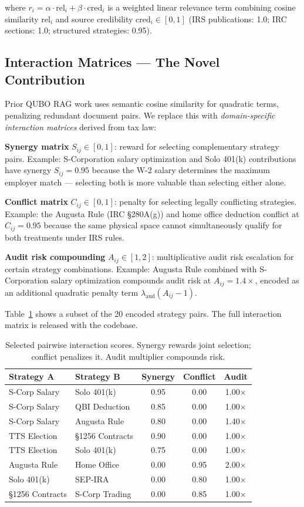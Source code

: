 \documentclass{article}
\begin{document}
where $r_i = \alpha \cdot \text{rel}_i + \beta \cdot \text{cred}_i$ is
a weighted linear relevance term combining cosine similarity
$\text{rel}_i$ and source credibility $\text{cred}_i \in [0, 1]$
(IRS publications: 1.0; IRC sections: 1.0; structured strategies: 0.95).

\subsection{Interaction Matrices — The Novel Contribution}

Prior QUBO RAG work \cite{qrag2025} uses semantic cosine similarity for
quadratic terms, penalizing redundant document pairs. We replace this
with \emph{domain-specific interaction matrices} derived from tax law:

\textbf{Synergy matrix} $S_{ij} \in [0, 1]$: reward for selecting
complementary strategy pairs. Example: S-Corporation salary
optimization and Solo 401(k) contributions have synergy $S_{ij} = 0.95$
because the W-2 salary determines the maximum employer match —
selecting both is more valuable than selecting either alone.

\textbf{Conflict matrix} $C_{ij} \in [0, 1]$: penalty for selecting
legally conflicting strategies. Example: the Augusta Rule (IRC §280A(g))
and home office deduction conflict at $C_{ij} = 0.95$ because the same
physical space cannot simultaneously qualify for both treatments under
IRS rules.

\textbf{Audit risk compounding} $A_{ij} \in [1, 2]$: multiplicative
audit risk escalation for certain strategy combinations. Example:
Augusta Rule combined with S-Corporation salary optimization compounds
audit risk at $A_{ij} = 1.4\times$, encoded as an additional quadratic
penalty term $\lambda_{\text{aud}}(A_{ij} - 1)$.

Table~\ref{tab:interactions} shows a subset of the 20 encoded strategy
pairs. The full interaction matrix is released with the codebase.

\begin{table}[h]
\centering
\caption{Selected pairwise interaction scores. Synergy rewards joint
selection; conflict penalizes it. Audit multiplier compounds risk.}
\label{tab:interactions}
\small
\begin{tabular}{llccc}
\toprule
Strategy A & Strategy B & Synergy & Conflict & Audit \\
\midrule
S-Corp Salary & Solo 401(k) & 0.95 & 0.00 & 1.00× \\
S-Corp Salary & QBI Deduction & 0.85 & 0.00 & 1.00× \\
S-Corp Salary & Augusta Rule & 0.80 & 0.00 & 1.40× \\
TTS Election & §1256 Contracts & 0.90 & 0.00 & 1.00× \\
TTS Election & Solo 401(k) & 0.75 & 0.00 & 1.00× \\
Augusta Rule & Home Office & 0.00 & 0.95 & 2.00× \\
Solo 401(k) & SEP-IRA & 0.00 & 0.80 & 1.00× \\
§1256 Contracts & S-Corp Trading & 0.00 & 0.85 & 1.00× \\
\bottomrule
\end{tabular}
\end{table}
\end{document}
